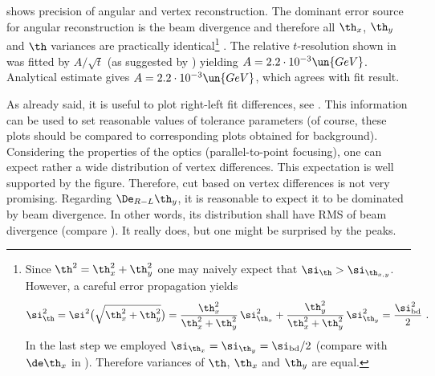  shows precision of angular and vertex reconstruction. The dominant error source for angular reconstruction is the beam divergence and therefore all $\th_x$, $\th_y$ and $\th$ variances are practically identical\footnote{%
Since $\th^2 = \th_x^2 + \th_y^2$ one may naively expect that $\si_{\th} > \si_{\th_{x, y}}$. However, a careful error propagation yields
$$\si^2_{\th} = \si^2\big(\sqrt{\th_x^2 + \th_y^2}\big) = {\th_x^2\over \th_x^2 + \th_y^2}\, \si^2_{\th_x} + {\th_y^2\over \th_x^2 + \th_y^2}\, \si^2_{\th_y} = {\si^2_{\rm bd}\over 2}\ .$$
In the last step we employed $\si_{\th_x} = \si_{\th_y} = \si_{\rm bd}/2$ (compare with $\de\th_x$ in ). Therefore variances of $\th$, $\th_x$ and $\th_y$ are equal.
}%
. The relative $t$-resolution shown in  was fitted by $A/\sqrt{t}$ (as suggested by ) yielding $A = 2.2\cdot10^{-3}\un{GeV}$. Analytical estimate gives $A = 2.2\cdot10^{-3}\un{GeV}$, which agrees with fit result.

As already said, it is useful to plot right-left fit differences, see . This information can be used to set reasonable values of tolerance parameters (of course, these plots should be compared to corresponding plots obtained for background). Considering the properties of the optics (parallel-to-point focusing), one can expect rather a wide distribution of vertex differences. This expectation is well supported by the figure. Therefore, cut based on vertex differences is not very promising. Regarding $\De_{R-L}\th_y$, it is reasonable to expect it to be dominated by beam divergence. In other words, its distribution shall have RMS of beam divergence (compare ). It really does, but one might be surprised by the peaks. 

\break\hbox{}\kern-14mm
\kern-3mm
\kern-3mm

